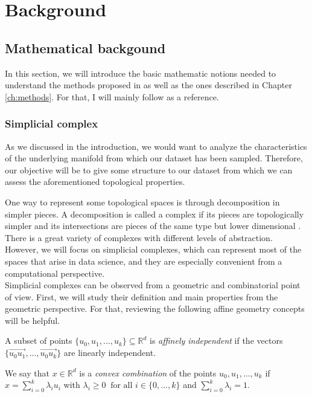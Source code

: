\documentclass[../main.tex]{subfiles}
\begin{document}
\chapter{Background}
\label{ch:background}

\section{Mathematical backgound}
In this section, we will introduce the basic mathematic notions needed to understand the methods proposed in \cite{hofer_densified_2021, moschella_relative_2022} as well as the ones described in Chapter \ref{ch:methods}.  For that, I will mainly follow \cite{edelsbrunner_computational_2010}  as a reference.

\subsection{Simplicial complex}
As we discussed in the introduction, we would want to analyze the characteristics of the underlying manifold from which our dataset has been sampled. Therefore, our objective will be to give some structure to our dataset from which we can assess the aforementioned topological properties.

One way to represent some topological spaces is through decomposition in simpler pieces. A decomposition is called a complex if its pieces are topologically simpler and its intersections are pieces of the same type but lower dimensional \cite{edelsbrunner_computational_2010}. There is a great variety of complexes with different levels of abstraction. However, we will focus on simplicial complexes, which can represent most of the spaces that arise in data science, and they are especially convenient from a computational perspective.\\

Simplicial complexes can be observed from a geometric and combinatorial point of view. First, we will study their definition and main properties from the geometric perspective. For that, reviewing the following affine geometry concepts will be helpful. 

\begin{definition}
A subset of points $\{u_0, u_1, ..., u_k\} \subseteq \mathbb{R}^d$ is \emph{affinely independent} if the vectors $\{\overrightarrow{u_0u_1}, ..., \overrightarrow{u_0u_k}\}$ are linearly independent.
\end{definition}

\begin{definition}
\begin{sloppypar}
We say that $x \in \mathbb{R}^d$ is a \emph{convex combination} of the points ${u_0, u_1, ..., u_k}$ if $x = \sum_{i=0}^{k} \lambda_i u_i$ with $\lambda_i \geq 0 \ \text{ for all } i \in \{0,...,k\}$ and $\sum_{i=0}^{k} \lambda_i = 1$.
\end{sloppypar}
\end{definition}
\end{document}
